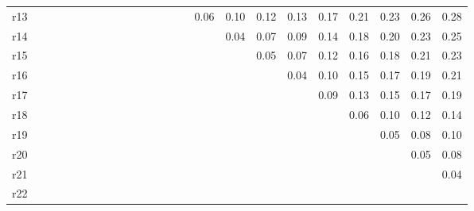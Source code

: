 \begin{table}
\begin{tabular}{lrrrrrrrrrrrrrrrrrrrrrrr}
r13 &  &  &  &  &  &  &  &  &  &  &  &  &  &  & 0.06 & 0.10 & 0.12 & 0.13 & 0.17 & 0.21 & 0.23 & 0.26 & 0.28 \\
r14 &  &  &  &  &  &  &  &  &  &  &  &  &  &  &  & 0.04 & 0.07 & 0.09 & 0.14 & 0.18 & 0.20 & 0.23 & 0.25 \\
r15 &  &  &  &  &  &  &  &  &  &  &  &  &  &  &  &  & 0.05 & 0.07 & 0.12 & 0.16 & 0.18 & 0.21 & 0.23 \\
r16 &  &  &  &  &  &  &  &  &  &  &  &  &  &  &  &  &  & 0.04 & 0.10 & 0.15 & 0.17 & 0.19 & 0.21 \\
r17 &  &  &  &  &  &  &  &  &  &  &  &  &  &  &  &  &  &  & 0.09 & 0.13 & 0.15 & 0.17 & 0.19 \\
r18 &  &  &  &  &  &  &  &  &  &  &  &  &  &  &  &  &  &  &  & 0.06 & 0.10 & 0.12 & 0.14 \\
r19 &  &  &  &  &  &  &  &  &  &  &  &  &  &  &  &  &  &  &  &  & 0.05 & 0.08 & 0.10 \\
r20 &  &  &  &  &  &  &  &  &  &  &  &  &  &  &  &  &  &  &  &  &  & 0.05 & 0.08 \\
r21 &  &  &  &  &  &  &  &  &  &  &  &  &  &  &  &  &  &  &  &  &  &  & 0.04 \\
r22 &  &  &  &  &  &  &  &  &  &  &  &  &  &  &  &  &  &  &  &  &  &  &  \\
\bottomrule
\end{tabular}
\end{table}
